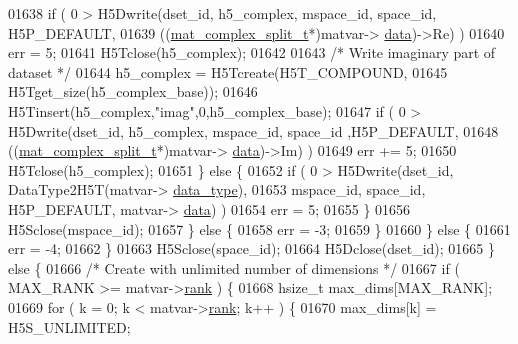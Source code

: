 \begin{DoxyCode}
{{01638                         \textcolor{keywordflow}{if} ( 0 > H5Dwrite(dset\_id, h5\_complex, mspace\_id, space\_id, H5P\_DEFAULT,
01639                                           ((\hyperlink{group___m_a_t_structmat__complex__split__t}{mat\_complex\_split\_t}*)matvar->
      \hyperlink{group___m_a_t_a5672978efa230bbdecdf38ede781f7fa}{data})->Re) )
01640                             err = 5;
01641                         H5Tclose(h5\_complex);
01642 
01643                         \textcolor{comment}{/* Write imaginary part of dataset */}
01644                         h5\_complex = H5Tcreate(H5T\_COMPOUND,
01645                                                H5Tget\_size(h5\_complex\_base));
01646                         H5Tinsert(h5\_complex,\textcolor{stringliteral}{"imag"},0,h5\_complex\_base);
01647                         \textcolor{keywordflow}{if} ( 0 > H5Dwrite(dset\_id, h5\_complex, mspace\_id, space\_id ,H5P\_DEFAULT,
01648                                           ((\hyperlink{group___m_a_t_structmat__complex__split__t}{mat\_complex\_split\_t}*)matvar->
      \hyperlink{group___m_a_t_a5672978efa230bbdecdf38ede781f7fa}{data})->Im) )
01649                             err += 5;
01650                         H5Tclose(h5\_complex);
01651                     \} \textcolor{keywordflow}{else} \{
01652                         \textcolor{keywordflow}{if} ( 0 > H5Dwrite(dset\_id, DataType2H5T(matvar->
      \hyperlink{group___m_a_t_ab6aafe9bd77f0f077852593dec438144}{data\_type}),
01653                                           mspace\_id, space\_id, H5P\_DEFAULT, matvar->
      \hyperlink{group___m_a_t_a5672978efa230bbdecdf38ede781f7fa}{data}) )
01654                             err = 5;
01655                     \}
01656                     H5Sclose(mspace\_id);
01657                 \} \textcolor{keywordflow}{else} \{
01658                     err = -3;
01659                 \}
01660             \} \textcolor{keywordflow}{else} \{
01661                 err = -4;
01662             \}
01663             H5Sclose(space\_id);
01664             H5Dclose(dset\_id);
01665         \} \textcolor{keywordflow}{else} \{
01666             \textcolor{comment}{/* Create with unlimited number of dimensions */}
01667             \textcolor{keywordflow}{if} ( MAX\_RANK >= matvar->\hyperlink{group___m_a_t_a84ba70c96ded13cc555fa75b768d9921}{rank} ) \{
01668                 hsize\_t max\_dims[MAX\_RANK];
01669                 \textcolor{keywordflow}{for} ( k = 0; k < matvar->\hyperlink{group___m_a_t_a84ba70c96ded13cc555fa75b768d9921}{rank}; k++ ) \{
01670                     max\_dims[k] = H5S\_UNLIMITED;
}}
\end{DoxyCode}

